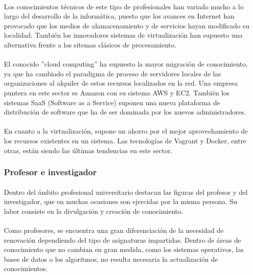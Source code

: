\documentclass[12pt, a4paper]{report}
\begin{document}
                \paragraph{}
                Los conocimientos técnicos de este tipo de profesionales han variado mucho a lo largo del desarrollo de la informática, puesto que los avances en Internet han provocado que los medios de alamacenamiento y de servicios hayan modificado su localidad. También los innovadores sistemas de virtualización han supuesto una alternativa frente a los sitemas clásicos de procesamiento. 
                
                \paragraph{}
                El conocido ''cloud computing'' ha supuesto la mayor migración de conocimiento, ya que ha cambiado el paradigma de proceso de servidores locales de las organizaciones al alquiler de estos recursos localizados en la red. Una empresa puntera en este sector es Amazon con su sistema AWS y EC2. También los sistemas SaaS (Software as a Service) suponen una nueva plataforma de distribución de software que ha de ser dominada por los nuevos administradores. 
                
                \paragraph{}
                En cuanto a la virtualización, supone un ahorro por el mejor aprovechamiento de los recursos existentes en un sistema. Las tecnologías de Vagrant y Docker, entre otras, están siendo las últimas tendencias en este sector.
        	
    		\subsubsection{Profesor e investigador}
        		\paragraph{}
                Dentro del ámbito profesional universitario destacan las figuras del profesor y del investigador, que en muchas ocasiones son ejercidas por la misma persona. Su labor consiste en la divulgación y creación de conocimiento.
                
                \paragraph{}
                Como profesores, se encuentra una gran diferenciación de la necesidad de renovación dependiendo del tipo de asignaturas impartidas. Dentro de áreas de conocimiento que no cambian en gran medida, como los sistemas operativos, las bases de datos o los algoritmos, no resulta necesaria la actualización de conocimientos.
                
\end{document}
